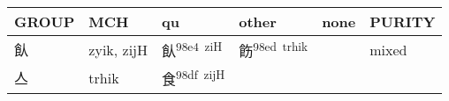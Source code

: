 \documentclass[14pt,a4paper]{scrartcl}
\begin{document}
\begin{longtable}[c]{@{}llllll@{}}
\toprule
\begin{minipage}[b]{0.14\columnwidth}\raggedright\strut
GROUP
\strut\end{minipage} &
\begin{minipage}[b]{0.14\columnwidth}\raggedright\strut
MCH
\strut\end{minipage} &
\begin{minipage}[b]{0.14\columnwidth}\raggedright\strut
qu
\strut\end{minipage} &
\begin{minipage}[b]{0.14\columnwidth}\raggedright\strut
other
\strut\end{minipage} &
\begin{minipage}[b]{0.14\columnwidth}\raggedright\strut
none
\strut\end{minipage} &
\begin{minipage}[b]{0.14\columnwidth}\raggedright\strut
PURITY
\strut\end{minipage}\tabularnewline
\midrule
\endhead
\begin{minipage}[t]{0.14\columnwidth}\raggedright\strut
飤
\strut\end{minipage} &
\begin{minipage}[t]{0.14\columnwidth}\raggedright\strut
zyik, zijH
\strut\end{minipage} &
\begin{minipage}[t]{0.14\columnwidth}\raggedright\strut
飤\textsuperscript{98e4~ziH}
\strut\end{minipage} &
\begin{minipage}[t]{0.14\columnwidth}\raggedright\strut
飭\textsuperscript{98ed~trhik}
\strut\end{minipage} &
\begin{minipage}[t]{0.14\columnwidth}\raggedright\strut
\strut\end{minipage} &
\begin{minipage}[t]{0.14\columnwidth}\raggedright\strut
mixed
\strut\end{minipage}\tabularnewline
\begin{minipage}[t]{0.14\columnwidth}\raggedright\strut
亼
\strut\end{minipage} &
\begin{minipage}[t]{0.14\columnwidth}\raggedright\strut
trhik
\strut\end{minipage} &
\begin{minipage}[t]{0.14\columnwidth}\raggedright\strut
食\textsuperscript{98df~zijH}

\end{minipage}
\end{longtable}
\end{document}

